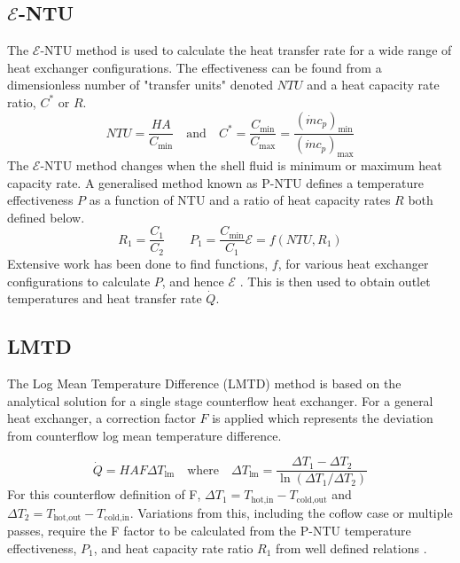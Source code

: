 \documentclass{article}
\begin{document}
\subsection{$\mathcal{E}$-NTU}
The $\mathcal{E}$-NTU method is used to calculate the heat transfer rate for a wide range of heat exchanger configurations.
The effectiveness can be found from a dimensionless number of "transfer units" denoted $NTU$ and a heat capacity rate ratio, $C^*$ or $R$.
\begin{equation}
  NTU = \frac{HA}{C_{\text{min}}} \quad \text{and} \quad C^* = \frac{C_{\text{min}}}{C_{\text{max}}} = \frac{(\dot{m}c_p)_{\text{min}}}{(\dot{m}c_p)_{\text{max}}}
\end{equation}
The $\mathcal{E}$-NTU method changes when the shell fluid is minimum or maximum heat capacity rate.
A generalised method known as P-NTU defines a temperature effectiveness $P$ as a function of NTU and a ratio of heat capacity rates $R$ both defined below.
\begin{equation}
   R_1 = \frac{C_1}{C_2} \quad \quad P_1 = \frac{C_\text{min}}{C_1} \mathcal{E} = f(NTU, R_1)
\end{equation}
Extensive work has been done to find functions, $f$, for various heat exchanger configurations to calculate $P$, and hence $\mathcal{E}$ \cite{HeatTransfer}.
This is then used to obtain outlet temperatures and heat transfer rate $\dot{Q}$.


\subsection{LMTD}

The Log Mean Temperature Difference (LMTD) method is based on the analytical solution for a single stage counterflow heat exchanger.
For a general heat exchanger, a correction factor $F$ is applied which represents the deviation from counterflow log mean temperature difference.

\begin{equation}
  \dot{Q} = HAF \Delta T_{\text{lm}} \quad \text{where} \quad \Delta T_{\text{lm}} = \frac{\Delta T_1 - \Delta T_2}{\ln(\Delta T_1 / \Delta T_2)}
\end{equation}
For this counterflow definition of F, $\Delta T_1 = T_{\text{hot,in}} - T_{\text{cold,out}}$ and $\Delta T_2 = T_{\text{hot,out}} - T_{\text{cold,in}}$.
Variations from this, including the coflow case or multiple passes, require the F factor to be calculated from the P-NTU temperature effectiveness, $P_1$, and heat capacity rate ratio $R_1$
from well defined relations \cite{HeatTransfer}.
\end{document}
